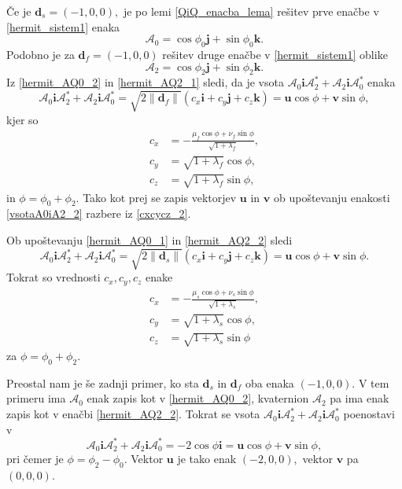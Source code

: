 \documentclass[12pt,a4paper,twoside]{article}
\theoremstyle{definition} %
\theoremstyle{plain} %
\theoremstyle{primerstyle}
\numberwithin{equation}{section}  %
\newcommand{\dV}{\mathbf{d}}
\newcommand{\iV}{\mathbf{i}}
\newcommand{\jV}{\mathbf{j}}
\newcommand{\kV}{\mathbf{k}}
\newcommand{\uV}{\mathbf{u}}
\newcommand{\vV}{\mathbf{v}}
\newcommand{\AQ}{\mathcal{A}}
\begin{document}
Če je $\dV_s=(-1,0,0),$ je po lemi \ref{QiQ_enacba_lema} rešitev prve enačbe v \eqref{hermit_sistem1} enaka
\begin{equation}
	\label{hermit_AQ0_2}
	\AQ_0=\cos\phi_0\jV+\sin\phi_0\kV.
\end{equation}
Podobno je za $\dV_f=(-1,0,0)$ rešitev druge enačbe v \eqref{hermit_sistem1} oblike
\begin{equation}
	\label{hermit_AQ2_2}
	\AQ_2=\cos\phi_2\jV+\sin\phi_2\kV.
\end{equation}
Iz \eqref{hermit_AQ0_2} in \eqref{hermit_AQ2_1} sledi, da je vsota $\AQ_0\iV\AQ_2^*+\AQ_2\iV\AQ_0^*$ enaka
\begin{equation}
	\label{vsotaA0iA2_2}
	\AQ_0\iV\AQ_2^*+\AQ_2\iV\AQ_0^*=\sqrt{2\lVert\dV_f\rVert}(c_x\iV+c_y\jV+c_z\kV)=\uV\cos\phi+\vV\sin\phi,
\end{equation}
kjer so
\begin{align}
	\label{cxcycz_2}
	c_x&=-\frac{\mu_f\cos\phi+\nu_f\sin\phi}{\sqrt{1+\lambda_f}},\nonumber\\
	c_y&=\sqrt{1+\lambda_f}\cos\phi,\\
	c_z&=\sqrt{1+\lambda_f}\sin\phi,\nonumber
\end{align}
in $\phi=\phi_0+\phi_2.$ Tako kot prej se zapis vektorjev $\uV$ in $\vV$ ob upoštevanju enakosti \eqref{vsotaA0iA2_2} razbere iz \eqref{cxcycz_2}.

Ob upoštevanju \eqref{hermit_AQ0_1} in \eqref{hermit_AQ2_2} sledi
\begin{equation}
	\label{vsotaA0iA2_3}
	\AQ_0\iV\AQ_2^*+\AQ_2\iV\AQ_0^*=\sqrt{2\lVert\dV_s\rVert}(c_x\iV+c_y\jV+c_z\kV)=\uV\cos\phi+\vV\sin\phi.
\end{equation}
Tokrat so vrednosti $c_x,c_y,c_z$ enake
\begin{align}
	\label{cxcycz_3}
	c_x&=-\frac{\mu_s\cos\phi+\nu_s\sin\phi}{\sqrt{1+\lambda_s}},\nonumber\\
	c_y&=\sqrt{1+\lambda_s}\cos\phi,\\
	c_z&=\sqrt{1+\lambda_s}\sin\phi\nonumber
\end{align}
za $\phi=\phi_0+\phi_2.$

Preostal nam je še zadnji primer, ko sta $\dV_s$ in $\dV_f$ oba enaka $(-1,0,0).$ V tem primeru ima $\AQ_0$ enak zapis kot v \eqref{hermit_AQ0_2}, kvaternion $\AQ_2$ pa ima enak zapis kot v enačbi \eqref{hermit_AQ2_2}. Tokrat se vsota $\AQ_0\iV\AQ_2^*+\AQ_2\iV\AQ_0^*$ poenostavi v
\begin{equation}
	\label{vsotaA0iA2_4}
	\AQ_0\iV\AQ_2^*+\AQ_2\iV\AQ_0^*=-2\cos\phi\iV=\uV\cos\phi+\vV\sin\phi,
\end{equation}
pri čemer je $\phi=\phi_2-\phi_0$. Vektor $\uV$ je tako enak $(-2,0,0),$ vektor $\vV$ pa $(0,0,0).$
\end{document}
